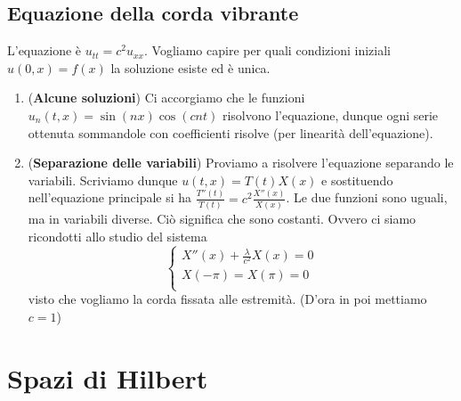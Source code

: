 \documentclass[a4paper,NoNotes,GeneralMath]{stdmdoc}
\begin{document}
        \subsection*{Equazione della corda vibrante}
        L'equazione è $u_{tt} = c^2 u_{xx}$. Vogliamo capire per quali condizioni iniziali $u(0, x) = f(x)$ la soluzione esiste ed è unica.
        \begin{enumerate}
        \item ({\bf Alcune soluzioni}) Ci accorgiamo che le funzioni $u_n(t, x) = \sin(nx) \cos(cnt)$ risolvono l'equazione, dunque ogni serie ottenuta sommandole con coefficienti risolve (per linearità dell'equazione).
        \item ({\bf Separazione delle variabili}) Proviamo a risolvere l'equazione separando le variabili. Scriviamo dunque $u(t, x) = T(t) X(x)$ e sostituendo nell'equazione principale si ha $\frac{T''(t)}{T(t)} = c^2 \frac{X''(x)}{X(x)}$. Le due funzioni sono uguali, ma in variabili diverse. Ciò significa che sono costanti. Ovvero ci siamo ricondotti allo studio del sistema $$\left\{ \begin{array}{c} X''(x) + \frac{\lambda}{c^2} X(x) = 0 \\ X(-\pi) = X(\pi) = 0 \\ \end{array} \right.$$ visto che vogliamo la corda fissata alle estremità. (D'ora in poi mettiamo $c = 1$)
        \end{enumerate}


        \section*{Spazi di Hilbert}
\end{document}
